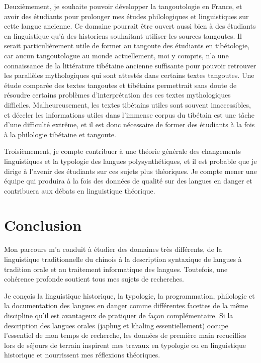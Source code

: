 \documentclass[oldfontcommands,oneside,a4paper,11pt]{memoir}
\begin{document}
Deuxièmement, je souhaite   pouvoir développer la tangoutologie en France, et avoir des étudiants pour prolonger mes études philologiques et linguistiques sur cette langue ancienne. Ce domaine pourrait être ouvert aussi bien à des étudiants en linguistique qu'à des historiens souhaitant utiliser les sources tangoutes. Il serait particulièrement utile de former au tangoute des étudiants en tibétologie, car aucun tangoutologue au monde actuellement, moi y compris, n'a une connaissance de la littérature tibétaine ancienne suffisante pour pouvoir retrouver les parallèles mythologiques qui sont attestés dans certains textes tangoutes. Une étude comparée des textes tangoutes et tibétains permettrait sans doute de résoudre certains problèmes d'interprétation des ces textes mythologiques difficiles. Malheureusement, les textes tibétains utiles sont souvent inaccessibles, et déceler les informations utiles dans l'immense corpus du tibétain est une tâche d'une difficulté extrême, et il est donc nécessaire de former des étudiants à la fois à la philologie tibétaine et tangoute.
 

Troisièmement, je compte  contribuer à une théorie générale des changements linguistiques et la typologie des langues polysynthétiques, et il est probable que je dirige à l'avenir des étudiants sur ces sujets plus théoriques. Je compte mener une équipe qui produira à la fois des données de qualité sur des langues en danger et contribuera aux débats   en linguistique théorique.

\chapter{Conclusion}
Mon parcours m'a conduit à étudier des domaines très différents, de la linguistique traditionnelle du chinois à la description syntaxique de langues à tradition orale et au traitement informatique des langues. Toutefois, une cohérence profonde soutient   tous mes sujets de recherches.

Je conçois la linguistique historique, la typologie, la programmation, philologie et la documentation des langues en danger  comme différentes facettes de la même discipline qu'il est avantageux de pratiquer de façon complémentaire. Si la description des langues orales (japhug et khaling essentiellement)   occupe l'essentiel de mon temps de recherche, les données de première main recueillies lors de   séjours de terrain  inspirent mes travaux en typologie ou en linguistique historique et nourrissent mes réflexions théoriques.
\end{document}

